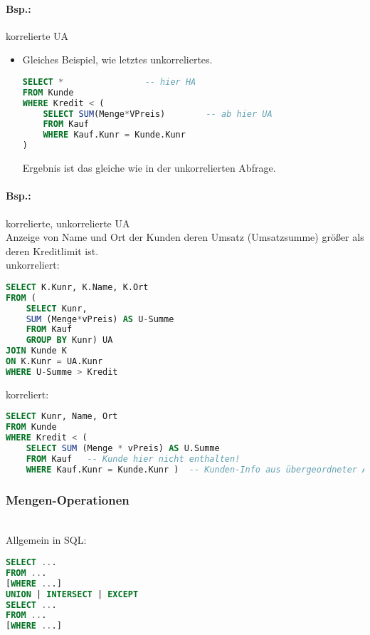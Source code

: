 \paragraph{Bsp.:} korrelierte UA
\begin{itemize}
\item Gleiches Beispiel, wie letztes unkorreliertes.
\begin{lstlisting}[language=SQL]
SELECT * 				-- hier HA
FROM Kunde 
WHERE Kredit < (
	SELECT SUM(Menge*VPreis)		-- ab hier UA
	FROM Kauf
	WHERE Kauf.Kunr = Kunde.Kunr
)
\end{lstlisting}
Ergebnis ist das gleiche wie in der unkorrelierten Abfrage.
\end{itemize}

\paragraph{Bsp.:} korrelierte, unkorrelierte UA\\
Anzeige von Name und Ort der Kunden deren Umsatz (Umsatzsumme) größer als deren Kreditlimit ist.\\
unkorreliert:
\begin{lstlisting}[language=SQL]
SELECT K.Kunr, K.Name, K.Ort
FROM (
	SELECT Kunr,
	SUM (Menge*vPreis) AS U-Summe
	FROM Kauf
	GROUP BY Kunr) UA
JOIN Kunde K
ON K.Kunr = UA.Kunr
WHERE U-Summe > Kredit
\end{lstlisting}
korreliert:
\begin{lstlisting}[language=SQL]
SELECT Kunr, Name, Ort
FROM Kunde
WHERE Kredit < (
	SELECT SUM (Menge * vPreis) AS U.Summe
	FROM Kauf	-- Kunde hier nicht enthalten!
	WHERE Kauf.Kunr = Kunde.Kunr )	-- Kunden-Info aus übergeordneter Abfrage
\end{lstlisting}

\subsubsection{Mengen-Operationen}
\\
Allgemein in SQL:
\begin{lstlisting}[language=SQL]
SELECT ...
FROM ...
[WHERE ...]
UNION | INTERSECT | EXCEPT
SELECT ...
FROM ...
[WHERE ...]
\end{lstlisting}
